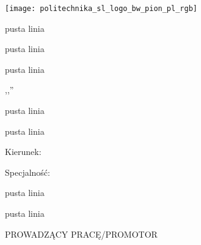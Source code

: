     \frontmatter
    
    \renewcommand{\baselinestretch}{1}
    \begin{titlepage}
    	\thispagestyle{empty}
     	\noindent\centering\texttt{[image: politechnika\_sl\_logo\_bw\_pion\_pl\_rgb]}
    	\par\noindent\centering\large{\color{white}pusta linia}
    	\vspace*{12pt}
    	\par\noindent\centering\Large{\bfseries\scshape\RodzajPracy}
    	\vspace*{12pt}
    	\par\noindent\centering\normalsize{\color{white}pusta linia}
    	\par\noindent\centering\large{\color{white}pusta linia}
    	\par\noindent\centering\large,,\TematPracy''
    	\par\noindent\centering\large{\color{white}pusta linia}
    	\vspace*{12pt}
    	\par\noindent\centering\large\bfseries\Autor
    	\par\noindent\centering\normalsize\bfseries\NumerAlbumu
    	\vspace*{12pt}
    	\par\noindent\centering\normalsize{\color{white}pusta linia}
    	\par\noindent\centering\large Kierunek: \KierunekStudiow
    	\par\noindent\centering\large Specjalność: \SciezkaSpecjalnosc
    	\par\noindent\centering\large{\color{white}pusta linia}
    	\par\noindent\centering\large{\color{white}pusta linia}
    	\par\noindent\centering\large\scshape PROWADZĄCY PRACĘ/PROMOTOR
    	\par\noindent\centering\large\Promotor
    	\par\noindent\centering\large\MakeLowercase{\capitalisewords{\Katedra}}

\end{titlepage}
